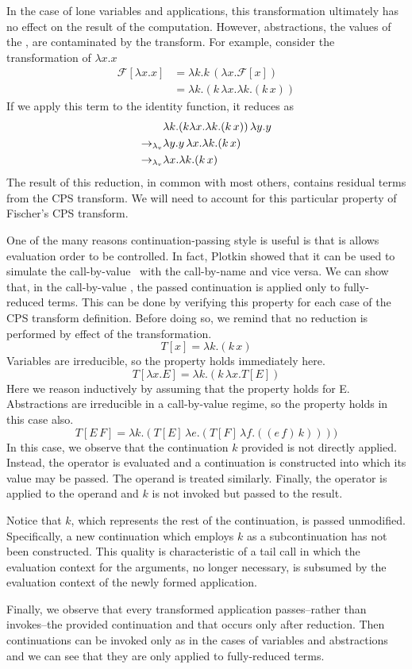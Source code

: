 In the case of lone variables and applications, this transformation ultimately has no
effect on the result of the computation. However, abstractions, the values of the
\lc, are contaminated by the transform. For example, consider the
transformation of $\lambda x.x$
\begin{align*}
\mathcal{F}[\lambda x.x] &= \lambda k.k\,(\lambda x.\mathcal{F}[x])\\
                         &= \lambda k.(k\,\lambda x.\lambda k.(k\,x))
\end{align*}
If we apply this term to the identity function, it reduces as
\begin{align*}
                        &\lambda k.(k \lambda x.\lambda k.(k\,x))\,\lambda y.y\\
\rightarrow_{\lambda_v} &\lambda y.y\,\lambda x.\lambda k.(k\,x)\\
\rightarrow_{\lambda_v} &\lambda x.\lambda k.(k\,x)
\end{align*}
The result of this reduction, in common with most others, contains residual terms from the
CPS transform. We will need to account for this particular property of Fischer's CPS
transform.

One of the many reasons continuation-passing style is useful is that is allows evaluation
order to be controlled. In fact, Plotkin \cite{plotkin1975call} showed that it can be used
to simulate the call-by-value \lc\ with the call-by-name \lc
and vice versa. We can show that, in the call-by-value \lc, the passed
continuation is applied only to fully-reduced terms. This can be done by verifying this
property for each case of the CPS transform definition. Before doing so, we remind that no
reduction is performed by effect of the transformation.
\[
T[x]=\lambda k.(k\,x)
\]
Variables are irreducible, so the property holds immediately here.
\[
T[\lambda x.E]=\lambda k.(k\,\lambda x.T[E])
\]
Here we reason inductively by assuming that the property holds for E. Abstractions are
irreducible in a call-by-value regime, so the property holds in this case also.
\[
T[E\,F]=\lambda k.(T[E]\,\lambda e.(T[F]\,\lambda f.((e\,f)\,k))))
\]
In this case, we observe that the continuation $k$ provided is not directly applied.
Instead, the operator is evaluated and a continuation is constructed into which its value
may be passed. The operand is treated similarly. Finally, the operator is applied to the
operand and $k$ is not invoked but passed to the result.

Notice that $k$, which represents the rest of the continuation, is passed unmodified.
Specifically, a new continuation which employs $k$ as a subcontinuation has not been
constructed. This quality is characteristic of a tail call in which the evaluation context
for the arguments, no longer necessary, is subsumed by the evaluation context of the newly
formed application.

Finally, we observe that every transformed application passes--rather than invokes--the
provided continuation and that occurs only after reduction. Then continuations can be
invoked only as in the cases of variables and abstractions and we can see that they are 
only applied to fully-reduced terms.

